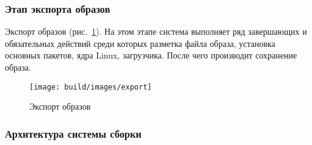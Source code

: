 \newpage
\subsubsection{Этап экспорта образов}
Экспорт образов (рис.~\ref{fig: export}). На этом этапе система выполняет ряд завершающих и обязательных действий среди которых разметка файла образа,
установка основных пакетов, ядра Linux, загрузчика. После чего производит сохранение образа.
\begin{figure}[h!]
  \centering
  \setlength{\fboxsep}{5pt}
  \texttt{[image: build/images/export]}
  \caption{Экспорт образов}\label{fig: export}
\end{figure}
\newpage
\subsubsection{Архитектура системы сборки}

